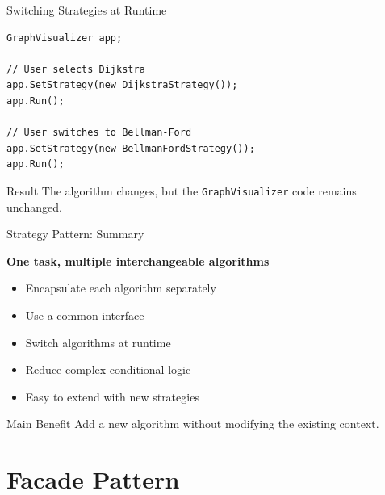 \documentclass[aspectratio=169]{beamer}
\begin{document}
\begin{frame}[fragile]{Switching Strategies at Runtime}

\begin{lstlisting}
GraphVisualizer app;

// User selects Dijkstra
app.SetStrategy(new DijkstraStrategy());
app.Run();

// User switches to Bellman-Ford
app.SetStrategy(new BellmanFordStrategy());
app.Run();
\end{lstlisting}

\begin{alertblock}{Result}
    The algorithm changes, but the \texttt{GraphVisualizer} code
    remains unchanged.
\end{alertblock}

\end{frame}

\begin{frame}{Strategy Pattern: Summary}

\begin{center}
    \Large
    \textbf{One task, multiple interchangeable algorithms}
\end{center}

\begin{itemize}
    \item Encapsulate each algorithm separately
    \item Use a common interface
    \item Switch algorithms at runtime
    \item Reduce complex conditional logic
    \item Easy to extend with new strategies
\end{itemize}

\begin{block}{Main Benefit}
    Add a new algorithm without modifying the existing context.
\end{block}

\end{frame}


\section{Facade Pattern}
\end{document}
